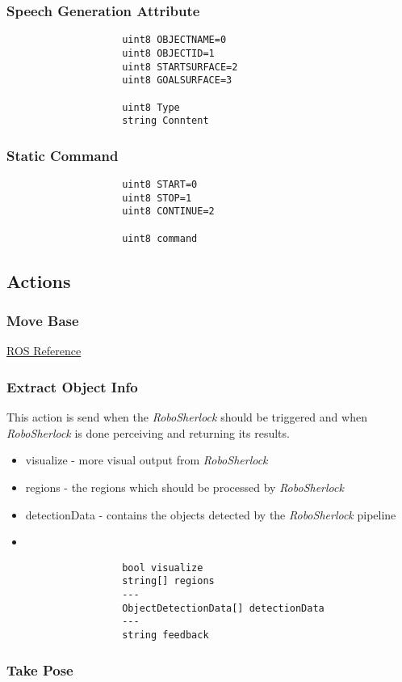 \documentclass[main.tex]{subfiles}
\begin{document}
				\subsubsection{Speech Generation Attribute}
					\begin{lstlisting}
					uint8 OBJECTNAME=0
					uint8 OBJECTID=1
					uint8 STARTSURFACE=2
					uint8 GOALSURFACE=3
					
					uint8 Type
					string Conntent
					\end{lstlisting}
				\subsubsection{Static Command}
					\begin{lstlisting}
					uint8 START=0
					uint8 STOP=1
					uint8 CONTINUE=2
		
					uint8 command
					\end{lstlisting}
				\subsection{Actions}
				\label{actions}
					\subsubsection{Move Base}
						\href{http://wiki.ros.org/move_base_msgs/MoveBaseAction}{ROS Reference}
					\subsubsection{Extract Object Info}
						This action is send when the \textit{RoboSherlock} should be triggered and when \textit{RoboSherlock} is done perceiving and returning its results.
					\begin{itemize}
						\item visualize - more visual output from \textit{RoboSherlock}
						\item regions - the regions which should be processed by \textit{RoboSherlock}
						\item detectionData - contains the objects detected by the \textit{RoboSherlock} pipeline
						\item
					\end{itemize}
					\begin{lstlisting}
					bool visualize
					string[] regions
					---
					ObjectDetectionData[] detectionData
					---
					string feedback
					\end{lstlisting}
					\subsubsection{Take Pose}
\end{document}
